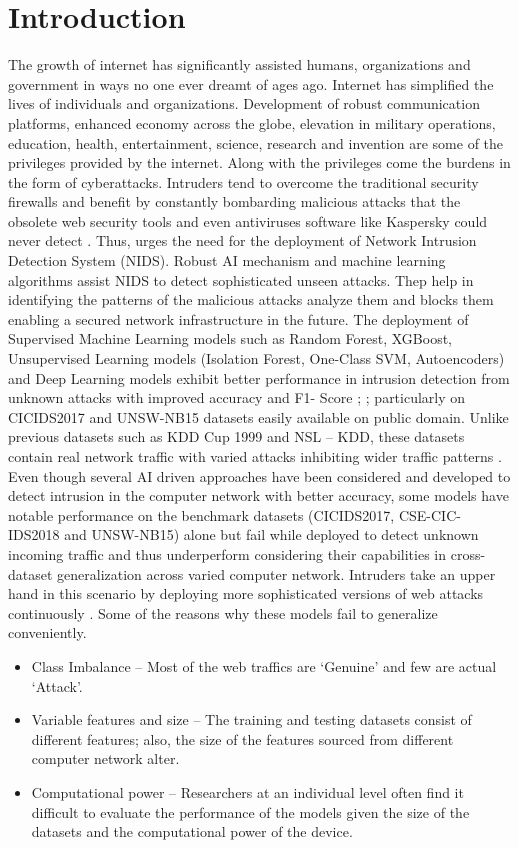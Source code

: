 \chapter{Introduction}
The growth of internet has significantly assisted humans, organizations and government in ways no one ever dreamt of ages ago. Internet has 
simplified the lives of individuals and organizations.  Development of robust communication platforms, enhanced economy across the globe, 
elevation in military operations, education, health, entertainment, science, research and invention are some of the privileges provided by 
the internet. Along with the privileges come the burdens in the form of cyberattacks. Intruders tend to overcome the traditional security 
firewalls and benefit by constantly bombarding malicious attacks that the obsolete web security tools and even antiviruses software like 
Kaspersky could never detect \cite{Miani2025}. Thus, urges the need for the deployment of Network Intrusion Detection System (NIDS). Robust AI 
mechanism and machine learning algorithms assist NIDS to detect sophisticated unseen attacks. Thep help in identifying the patterns of the malicious 
attacks analyze them and blocks them enabling a secured network infrastructure in the future. The deployment of Supervised Machine Learning models such 
as Random Forest, XGBoost, Unsupervised Learning models (Isolation Forest, One-Class SVM, Autoencoders) and Deep Learning models exhibit better performance in intrusion 
detection from unknown attacks with improved accuracy and F1- Score \cite{deCarvalhoBertoli2023}; \cite{Hamidou2025}; \cite{Wicaksana2026} particularly 
on CICIDS2017 and UNSW-NB15 datasets easily available on public domain. Unlike previous datasets such as KDD Cup 1999 and NSL – KDD, these datasets 
contain real network traffic with varied attacks inhibiting wider traffic patterns \cite{Moustafa2015,Sharafaldin2018}. Even though several AI driven 
approaches have been considered and developed to detect intrusion in the computer network with better accuracy, some models have notable performance on 
the benchmark datasets (CICIDS2017, CSE-CIC-IDS2018 and UNSW-NB15) alone but fail while deployed to detect unknown incoming traffic and thus underperform 
considering their capabilities in cross-dataset generalization across varied computer network. Intruders take an upper hand in this scenario by deploying 
more sophisticated versions of web attacks continuously \cite{Qazi2022}. Some of the reasons why these models fail to generalize conveniently.
\begin{itemize}
    \item Class Imbalance – Most of the web traffics are ‘Genuine’ and few are actual ‘Attack’.
    \item Variable features and size – The training and testing datasets consist of different features; also, the size of the features sourced from different computer network alter.
    \item Computational power – Researchers at an individual level often find it difficult to evaluate the performance of the models given the size of the datasets and the computational power of the device.
\end{itemize}
